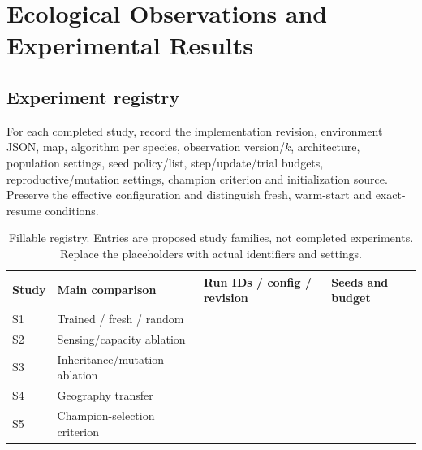 \section{Ecological Observations and Experimental Results}\label{sec:observations}

\subsection{Experiment registry}
For each completed study, record the implementation revision, environment JSON,
map, algorithm per species, observation version/$k$, architecture, population
settings, seed policy/list, step/update/trial budgets, reproductive/mutation
settings, champion criterion and initialization source. Preserve the effective
configuration and distinguish fresh, warm-start and exact-resume conditions.

\begin{table}[ht]
\centering\small
\caption{Fillable registry. Entries are proposed study families, not completed
experiments. Replace the placeholders with actual identifiers and settings.}
\label{tab:registry}
\begin{tabularx}{\linewidth}{@{}lYYY@{}}\toprule
Study & Main comparison & Run IDs / config / revision & Seeds and budget\\\midrule
S1 & Trained / fresh / random &  & \\
S2 & Sensing/capacity ablation &  & \\
S3 & Inheritance/mutation ablation &  & \\
S4 & Geography transfer &  & \\
S5 & Champion-selection criterion &  & \\\bottomrule
\end{tabularx}
\end{table}

